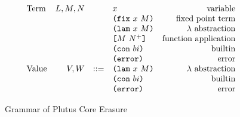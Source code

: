 \documentclass[../main.tex]{subfiles}
\begin{document}
\begin{figure*}[t]
    \centering
    \[\begin{array}{lrclr}
        \textrm{Term}             & L,M,N  &     & x                        & \textrm{variable}\\
                                  &        &     & \texttt{(} \texttt{fix} ~ x ~ M \texttt{)}              & \textrm{fixed point term}\\
                                  &        &     & \texttt{(} \texttt{lam} ~ x ~ M \texttt{)}              & \textrm{$\lambda$ abstraction}\\
                                  &        &     & \texttt{[} M ~ N^+ \texttt{]}            & \textrm{function application}\\
                                  &        &     & \texttt{(} \texttt{con} ~ bi \texttt{)}                & \textrm{builtin}\\
                                  &        &     & \texttt{(} \texttt{error} \texttt{)}{}                & \textrm{error}\\
        \textrm{Value}            & V,W    & ::= & \texttt{(} \texttt{lam} ~ x ~ M \texttt{)}              & \textrm{$\lambda$ abstraction}\\
                                  &        &     & \texttt{(} \texttt{con} ~ bi \texttt{)}                & \textrm{builtin}\\
                                  &        &     & \texttt{(} \texttt{error} \texttt{)}{}                & \textrm{error}\\

    \end{array}\]
    \caption{Grammar of Plutus Core Erasure}
    \label{fig:Plutus_core_erasure_grammar}
\end{figure*}
\end{document}
